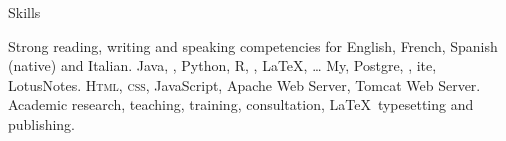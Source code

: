 \prefix{}
\begin{rubric}{Skills}


\entry*[Languages]
	Strong reading, writing and speaking competencies for English, French, Spanish (native) and Italian.
	Java, , Python, R, , \LaTeX, \ldots
\entry*[Databases]
	My, Postgre, , ite, LotusNotes.
	\textsc{Html, css}, JavaScript, Apache Web Server, Tomcat Web Server.
\entry*[Misc.]
	Academic research, teaching, training, consultation, \LaTeX\ typesetting and publishing.
\end{rubric}
